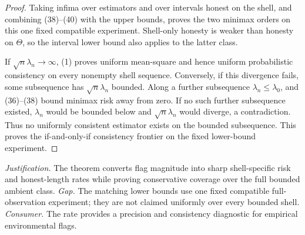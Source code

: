 \documentclass{article}
\begin{document}
\begin{proof}
Taking infima over estimators and over intervals honest on the shell, and combining (38)--(40) with the upper bounds, proves the two minimax orders on this one fixed compatible experiment.  Shell-only honesty is weaker than honesty on \(\Theta\), so the interval lower bound also applies to the latter class.

If \(\sqrt n\lambda_n\to\infty\), (1) proves uniform mean-square and hence uniform probabilistic consistency on every nonempty shell sequence.  Conversely, if this divergence fails, some subsequence has \(\sqrt n\lambda_n\) bounded.  Along a further subsequence \(\lambda_n\leq\lambda_0\), and (36)--(38) bound minimax risk away from zero.  If no such further subsequence existed, \(\lambda_n\) would be bounded below and \(\sqrt n\lambda_n\) would diverge, a contradiction.  Thus no uniformly consistent estimator exists on the bounded subsequence.  This proves the if-and-only-if consistency frontier on the fixed lower-bound experiment.
\end{proof}
\par\smallskip\noindent \textit{Justification.} The theorem converts flag magnitude into sharp shell-specific risk and honest-length rates while proving conservative coverage over the full bounded ambient class. \textit{Gap.} The matching lower bounds use one fixed compatible full-observation experiment; they are not claimed uniformly over every bounded shell. \textit{Consumer.} The rate provides a precision and consistency diagnostic for empirical environmental flags.
\end{document}
